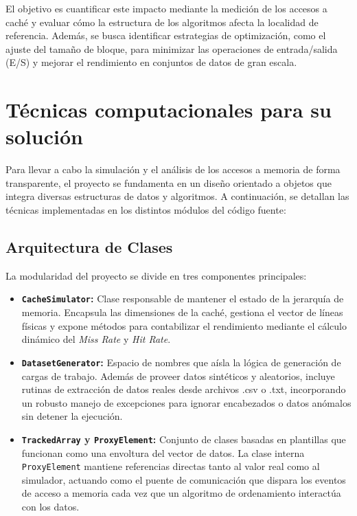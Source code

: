 \documentclass[12pt, a4paper]{article}
\begin{document}
	El objetivo es cuantificar este impacto mediante la medición de los accesos a caché y evaluar cómo la estructura de los algoritmos afecta la localidad de referencia. Además, se busca identificar estrategias de optimización, como el ajuste del tamaño de bloque, para minimizar las operaciones de entrada/salida (E/S) y mejorar el rendimiento en conjuntos de datos de gran escala.\\
	
	\section{Técnicas computacionales para su solución}
	
	Para llevar a cabo la simulación y el análisis de los accesos a memoria de forma transparente, el proyecto se fundamenta en un diseño orientado a objetos que integra diversas estructuras de datos y algoritmos. A continuación, se detallan las técnicas implementadas en los distintos módulos del código fuente:
	
	\subsection{Arquitectura de Clases}
	La modularidad del proyecto se divide en tres componentes principales:
	
	\begin{itemize}
		\item \textbf{\texttt{CacheSimulator}:} Clase responsable de mantener el estado de la jerarquía de memoria. Encapsula las dimensiones de la caché, gestiona el vector de líneas físicas y expone métodos para contabilizar el rendimiento mediante el cálculo dinámico del \textit{Miss Rate} y \textit{Hit Rate}.
		
		\item \textbf{\texttt{DatasetGenerator}:} Espacio de nombres que aísla la lógica de generación de cargas de trabajo. Además de proveer datos sintéticos y aleatorios, incluye rutinas de extracción de datos reales desde archivos .csv o .txt, incorporando un robusto manejo de excepciones para ignorar encabezados o datos anómalos sin detener la ejecución.
		
		\item \textbf{\texttt{TrackedArray} y \texttt{ProxyElement}:} Conjunto de clases basadas en plantillas que funcionan como una envoltura del vector de datos. La clase interna \texttt{ProxyElement} mantiene referencias directas tanto al valor real como al simulador, actuando como el puente de comunicación que dispara los eventos de acceso a memoria cada vez que un algoritmo de ordenamiento interactúa con los datos.
	\end{itemize}
	
\end{document}
